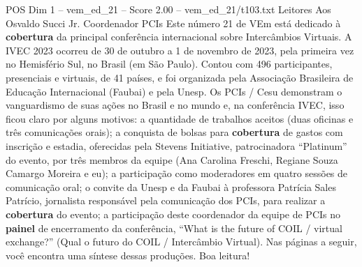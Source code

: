 \begin{textsample}{POS Dim 1 – vem\_ed\_21 – Score 2.00 – vem\_ed\_21/t103.txt}  \label{ex:f1_pos_036}
Leitores Aos Osvaldo Succi Jr.
Coordenador PCIs Este número 21 de VEm está dedicado à \textbf{cobertura} da principal conferência internacional sobre Intercâmbios Virtuais.
A IVEC 2023 ocorreu de 30 de outubro a 1 de novembro de 2023, pela primeira vez no Hemisfério Sul, no Brasil (em São Paulo).
Contou com 496 participantes, presenciais e virtuais, de 41 países, e foi organizada pela Associação Brasileira de Educação Internacional (Faubai) e pela Unesp.
Os PCIs / Cesu demonstram o vanguardismo de suas ações no Brasil e no mundo e, na conferência IVEC, isso ficou claro por alguns motivos: a quantidade de trabalhos aceitos (duas oficinas e três comunicações orais); a conquista de bolsas para \textbf{cobertura} de gastos com inscrição e estadia, oferecidas pela Stevens Initiative, patrocinadora “Platinum” do evento, por três membros da equipe (Ana Carolina Freschi, Regiane Souza Camargo Moreira e eu); a participação como moderadores em quatro sessões de comunicação oral; o convite da Unesp e da Faubai à professora Patrícia Sales Patrício, jornalista responsável pela comunicação dos PCIs, para realizar a \textbf{cobertura} do evento; a participação deste coordenador da equipe de PCIs no \textbf{painel} de encerramento da conferência, “What is the future of COIL / virtual exchange?” (Qual o futuro do COIL / Intercâmbio Virtual).
Nas páginas a seguir, você encontra uma síntese dessas produções.
Boa leitura!

\end{textsample}
